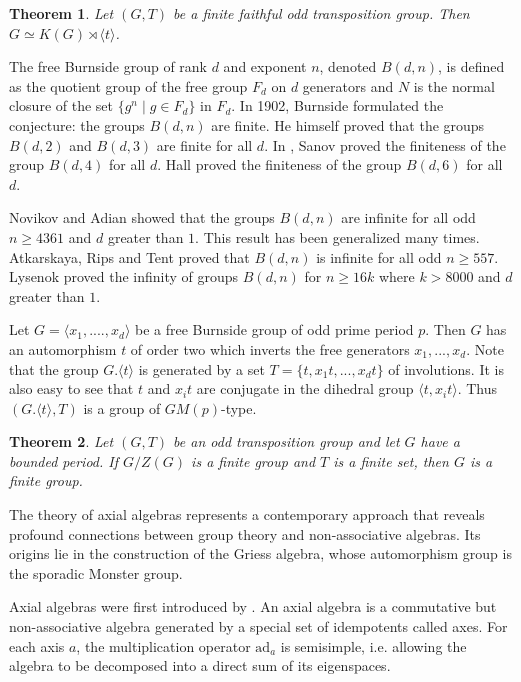 \documentclass[12pt]{article}
\newcommand\la{\langle}
\newcommand\ra{\rangle}
\newtheorem{Th}{Theorem}
\begin{document}
\begin{Th}
	Let $(G,T)$ be a finite faithful odd transposition group. Then $G\simeq K(G)\rtimes \la t\ra$.
\end{Th}	
	
	
	The free Burnside group of rank $d$ and exponent $n$, denoted $B(d, n)$, is defined as the quotient group of the free group $F_d$ on $d$ generators and $N$ is the normal closure of the set $\{g^n \mid g \in F_d\}$ in $F_d$. In 1902, Burnside \cite{B02} formulated the conjecture: the groups $B(d, n)$ are finite. He himself proved that the groups $B(d,2)$ and $B(d,3)$ are finite for all $d$. In \cite{Sa40}, Sanov proved the finiteness of the group $B(d,4)$ for all $d$. Hall \cite{Ha58} proved the finiteness of the group $B(d,6)$ for all $d$.
	
	Novikov and Adian \cite{NA68} showed that the groups $B(d,n)$ are infinite for all odd $n\geq4361$ and $d$ greater than $1$. This result has been generalized many times. Atkarskaya, Rips and Tent \cite{R24} proved that $B(d, n)$ is infinite for all odd $n\geq 557$. Lysenok \cite{Ly} proved the infinity of groups $B(d, n)$ for $n\geq 16k$ where $k > 8000$ and $d$ greater than $1$.
	
	Let $G=\la x_1,....,x_d\ra$ be a free Burnside group of odd prime period $p$. Then $G$ has an automorphism $t$ of order two which inverts the free generators $x_1,...,x_d$. Note that the group $G.\la t\ra$ is generated by a set $T=\{t, x_1t,..., x_dt\}$ of involutions. It is also easy to see that $t$ and $x_it$ are conjugate in the dihedral group $\la t, x_i t\ra$. Thus $(G.\la t\ra, T)$ is a group of $GM(p)$-type. 
\begin{Th}
 Let $(G,T)$ be an odd transposition group and let $G$ have a bounded period. If $G/Z(G)$ is a finite group and $T$ is a finite set, then $G$ is a finite group.
\end{Th}	
%
	The theory of axial algebras represents a contemporary approach that reveals profound connections between group theory and non-associative algebras. Its origins lie in the construction of the Griess algebra, whose automorphism group is the sporadic Monster group.
	
	Axial algebras were first introduced by \cite{HRS}. An axial algebra is a commutative but non-associative algebra generated by a special set of idempotents called axes. For each axis $a $, the multiplication operator $\text{ad}_a$ is semisimple, i.e. allowing the algebra to be decomposed into a direct sum of its eigenspaces.
	
\end{document}

